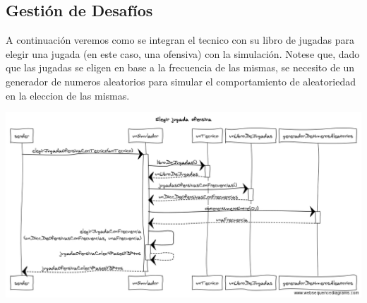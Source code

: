 \subsection{Gestión de Desafíos}



A continuación veremos como se integran el tecnico con su libro de jugadas para elegir una jugada (en este caso, una ofensiva) con la simulación. Notese que, dado que las jugadas se eligen en base a la frecuencia de las mismas, se necesito de un generador de numeros aleatorios para simular el comportamiento de aleatoriedad en la eleccion de las mismas.
\begin{center}
\includegraphics[scale=0.30]{diseno/Elegir_jugada_ofensiva.png} 
\end{center}



